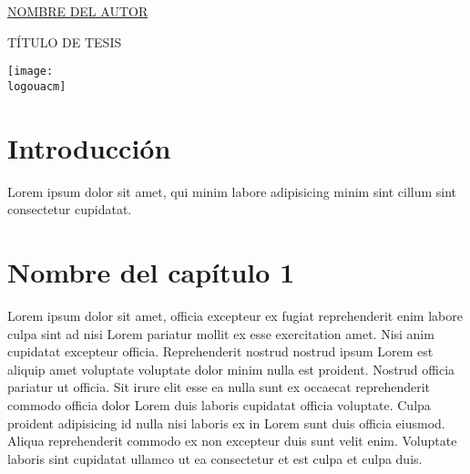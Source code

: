 \documentclass[letterpaper,12pt]{book} %
\newcommand{\logouacm}{/home/frvnzj/Escritorio/LaTeX/Images/uacm.jpg}
\newcommand{\startdate}{Febrero 05 del 2023}
\begin{document}
    \begin{titlepage}

      \centering

      \Large\underline{NOMBRE DEL AUTOR}
      
      \par\vspace{2cm}
      
      \fontsize{40}{20}\selectfont TÍTULO DE TESIS
      \par

      \vfill

      \texttt{[image: \\logouacm]}


    \end{titlepage}

    \clearpage
    \thispagestyle{empty}


\tableofcontents 


   \clearpage
   \thispagestyle{empty}


    \cleardoublepage{}
    
    
    \pagestyle{plain}    
    \chapter*{Introducción}

Lorem ipsum dolor sit amet, qui minim labore adipisicing minim sint cillum sint consectetur cupidatat.
    
\par

\clearpage


\chapter{Nombre del capítulo 1} 

\thispagestyle{empty}
\pagestyle{empty}

\cleardoublepage

\pagestyle{headings}

Lorem ipsum dolor sit amet, officia excepteur ex fugiat reprehenderit enim labore culpa sint ad nisi Lorem pariatur mollit ex esse exercitation amet. Nisi anim cupidatat excepteur officia. Reprehenderit nostrud nostrud ipsum Lorem est aliquip amet voluptate voluptate dolor minim nulla est proident. Nostrud officia pariatur ut officia. Sit irure elit esse ea nulla sunt ex occaecat reprehenderit commodo officia dolor Lorem duis laboris cupidatat officia voluptate. Culpa proident adipisicing id nulla nisi laboris ex in Lorem sunt duis officia eiusmod. Aliqua reprehenderit commodo ex non excepteur duis sunt velit enim. Voluptate laboris sint cupidatat ullamco ut ea consectetur et est culpa et culpa duis.
\end{document}

